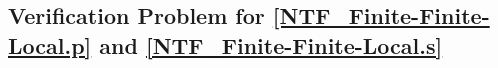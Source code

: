 \documentclass{easychair}
\begin{document}
\newpage
\subsection{Verification Problem for \ref{NTF_Finite-Finite-Local.p} and
\ref{NTF_Finite-Finite-Local.s}}
\label{NTF_Finite-Finite-Local.s.p}
\begin{small}

\end{small}

\end{document}
